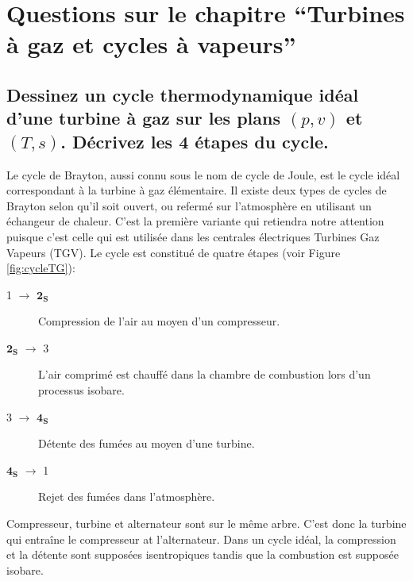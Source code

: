 \section{Questions sur le chapitre ``Turbines à gaz et cycles à vapeurs''}
\subsection{Dessinez un cycle thermodynamique idéal d'une turbine à gaz sur les plans $(p,v)$ et $(T,s)$. Décrivez les 4 étapes du cycle.}
Le cycle de Brayton, aussi connu sous le nom de cycle de Joule, est le cycle idéal correspondant à la turbine à gaz élémentaire. Il existe deux types de cycles de Brayton selon qu'il soit ouvert, ou refermé sur l'atmosphère en utilisant un échangeur de chaleur. C'est la première variante qui retiendra notre attention puisque c'est celle qui est utilisée dans les centrales électriques Turbines Gaz Vapeurs (TGV). Le cycle est constitué de quatre étapes (voir Figure \ref{fig:cycleTG}):
\begin{description}
	\item[1 $\rightarrow$ $\mathbf{2_S}$] Compression de l'air au moyen d'un compresseur.
	\item[$\mathbf{2_S}$ $\rightarrow$ 3] L'air comprimé est chauffé dans la chambre de combustion lors d'un processus isobare.
	\item[3 $\rightarrow$ $\mathbf{4_S}$] Détente des fumées au moyen d'une turbine.
	\item[$\mathbf{4_S}$ $\rightarrow$ 1] Rejet des fumées dans l'atmosphère.
\end{description} 
Compresseur, turbine et alternateur sont sur le même arbre. C'est donc la turbine qui entraîne le compresseur at l'alternateur. Dans un cycle idéal, la compression et la détente sont supposées isentropiques tandis que la combustion est supposée isobare.
